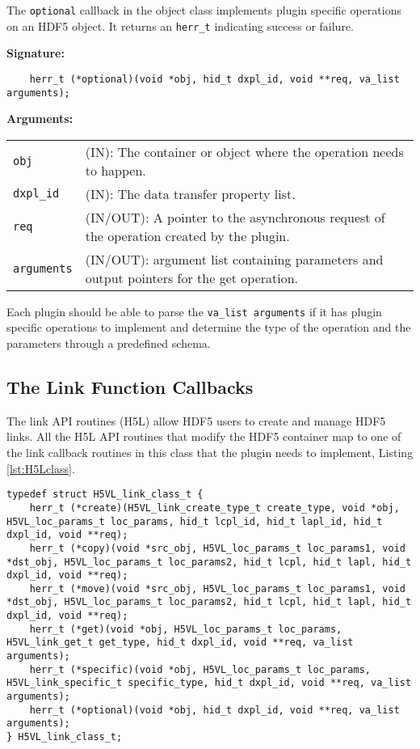 The \texttt{optional} callback in the object class implements plugin specific operations on an HDF5 object. It returns an \texttt{herr\_t} indicating success or failure. \bigskip

\begin{mdframed}[style=bgbox]
\textbf{Signature:}
\begin{lstlisting}
    herr_t (*optional)(void *obj, hid_t dxpl_id, void **req, va_list arguments);
\end{lstlisting}

\textbf{Arguments:}\\
\begin{tabular}{l p{13.5cm}}
  \texttt{obj} & (IN): The container or object where the operation needs to happen.\\
  \texttt{dxpl\_id} & (IN): The data transfer property list.\\
  \texttt{req} & (IN/OUT): A pointer to the asynchronous request of the operation created by the plugin.\\
  \texttt{arguments} & (IN/OUT): argument list containing parameters and output pointers for the get operation. \\
\end{tabular}
\end{mdframed}

Each plugin should be able to parse the \texttt{va\_list arguments} if it has plugin specific operations to implement and determine the type of the operation and the parameters through a predefined schema. 

\subsection{The Link Function Callbacks}
The link API routines (H5L) allow HDF5 users to create and manage
HDF5 links. All the H5L API routines that modify the HDF5 container
map to one of the link callback routines in this class that the
plugin needs to implement, Listing \ref{lst:H5Lclass}.

\begin{lstlisting}[caption={Structure for link callback routines, H5VLpublic.h}, captionpos=b, label={lst:H5Lclass}]
typedef struct H5VL_link_class_t {
    herr_t (*create)(H5VL_link_create_type_t create_type, void *obj, H5VL_loc_params_t loc_params, hid_t lcpl_id, hid_t lapl_id, hid_t dxpl_id, void **req);
    herr_t (*copy)(void *src_obj, H5VL_loc_params_t loc_params1, void *dst_obj, H5VL_loc_params_t loc_params2, hid_t lcpl, hid_t lapl, hid_t dxpl_id, void **req);
    herr_t (*move)(void *src_obj, H5VL_loc_params_t loc_params1, void *dst_obj, H5VL_loc_params_t loc_params2, hid_t lcpl, hid_t lapl, hid_t dxpl_id, void **req);
    herr_t (*get)(void *obj, H5VL_loc_params_t loc_params, H5VL_link_get_t get_type, hid_t dxpl_id, void **req, va_list arguments);
    herr_t (*specific)(void *obj, H5VL_loc_params_t loc_params, H5VL_link_specific_t specific_type, hid_t dxpl_id, void **req, va_list arguments);
    herr_t (*optional)(void *obj, hid_t dxpl_id, void **req, va_list arguments);
} H5VL_link_class_t;
\end{lstlisting}


